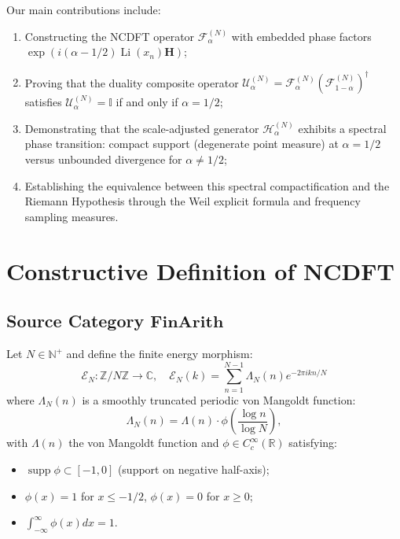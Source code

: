 \documentclass[12pt,a4paper]{amsart}
\theoremstyle{plain}
\theoremstyle{definition}
\theoremstyle{remark}
\DeclareMathOperator{\supp}{supp}
\DeclareMathOperator{\Li}{Li}
\begin{document}
Our main contributions include:
\begin{enumerate}
    \item Constructing the NCDFT operator $\mathcal{F}_\alpha^{(N)}$ with embedded phase factors $\exp(i(\alpha-1/2)\Li(x_n)\mathbf{H})$;
    \item Proving that the duality composite operator $\mathcal{U}_\alpha^{(N)} = \mathcal{F}_\alpha^{(N)}(\mathcal{F}_{1-\alpha}^{(N)})^\dagger$ satisfies $\mathcal{U}_\alpha^{(N)} = \mathbb{I}$ if and only if $\alpha = 1/2$;
    \item Demonstrating that the scale-adjusted generator $\mathcal{H}_\alpha^{(N)}$ exhibits a spectral phase transition: compact support (degenerate point measure) at $\alpha = 1/2$ versus unbounded divergence for $\alpha \neq 1/2$;
    \item Establishing the equivalence between this spectral compactification and the Riemann Hypothesis through the Weil explicit formula and frequency sampling measures.
\end{enumerate}

\section{Constructive Definition of NCDFT}

\subsection{Source Category $\mathbf{FinArith}$}

Let $N \in \mathbb{N}^+$ and define the finite energy morphism:
\begin{equation}
\mathcal{E}_N: \mathbb{Z}/N\mathbb{Z} \to \mathbb{C}, \quad \mathcal{E}_N(k) = \sum_{n=1}^{N-1} \Lambda_N(n) e^{-2\pi i k n / N}
\end{equation}
where $\Lambda_N(n)$ is a smoothly truncated periodic von Mangoldt function:
\begin{equation}
\Lambda_N(n) = \Lambda(n) \cdot \phi\left(\frac{\log n}{\log N}\right),
\end{equation}
with $\Lambda(n)$ the von Mangoldt function and $\phi \in C_c^\infty(\mathbb{R})$ satisfying:
\begin{itemize}
    \item $\supp \phi \subset [-1,0]$ (support on negative half-axis);
    \item $\phi(x)=1$ for $x \leq -1/2$, $\phi(x)=0$ for $x \geq 0$;
    \item $\int_{-\infty}^\infty \phi(x) dx = 1$.
\end{itemize}
\end{document}

